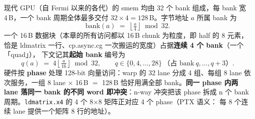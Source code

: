 现代 GPU（自 Fermi 以来的各代）的 smem 均由 32 个 bank 组成，每 bank 宽 4\,B，一个 bank 周期全体最多交付
$32\times4=128$\,B。字节地址 $a$ 所属 bank 为
\begin{equation}
  \mathrm{bank}(a) \;=\; \left\lfloor \tfrac{a}{4} \right\rfloor \bmod 32 .
  \label{eq:12-bank}
\end{equation}
一个 16\,B 数据块（本章的所有访问都以 16\,B chunk 为粒度，即 half 的 8 元素，
恰是 ldmatrix 一行、cp.async.cg 一次搬运的宽度）占据\textbf{连续 4 个 bank}（一个「quad」），
下文记其\textbf{起始 bank} 编号为
\begin{equation}
  q(a) \;=\; 4\left\lfloor \tfrac{a}{16} \right\rfloor \bmod 32, \qquad
  q \in \{0,4,\dots,28\}\ \text{（占 bank}\ q,\dots,q{+}3\text{）}.
\end{equation}
硬件按 \textbf{phase} 处理 128-bit 向量访问：warp 的 32 lane 分成 4 组、每组
8 lane 依次服务，一组 8 lane $\times$ 16\,B $=$ 128\,B 恰好用满全部 bank。\textbf{同一
phase 内两 lane 落同一 bank 的不同 word 即冲突}：n-way 冲突把该 phase 拆成 n 个
bank 周期。\texttt{ldmatrix.x4} 的 4 个 8$\times$8 矩阵正对应 4 个 phase（PTX 语义：
每 8 个连续 lane 提供一个矩阵 8 行的地址）。

